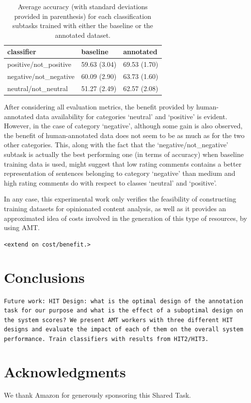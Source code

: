 \documentclass[11pt,letterpaper]{article}
\begin{document}
\begin{table}
\begin{tabular}{|l|l|l|}
\hline
classifier &baseline &annotated \\ 
\hline
positive/not\_positive &59.63 (3.04) &69.53 (1.70) \\ 
\hline
negative/not\_negative &60.09 (2.90) &63.73 (1.60) \\ 
\hline
neutral/not\_neutral &51.27 (2.49) &62.57 (2.08) \\ 
\hline
\end{tabular}
\caption{Average accuracy (with standard deviations provided in parenthesis) 
for each classification subtasks trained with either the baseline or the annotated dataset.}
\label{tc_accu}
\end{table}

After considering all evaluation metrics, the benefit provided by human-annotated data 
availability for categories `neutral' and `positive' is evident. However, in the case of category `negative', although some 
gain is also observed, the benefit of human-annotated data does not seem to be as much as for the two other 
categories. This, along with the fact that the `negative/not\_negative' subtask is actually the best performing
one (in terms of accuracy) when baseline training data is used, might suggest that low rating comments contains 
a better representation of sentences belonging to category `negative' than medium and high rating comments do with
respect to classes `neutral' and `positive'. 

In any case, this experimental work only verifies the feasibility of constructing training datasets for
opinionated content analysis, as well as it provides an approximated idea of costs involved in the generation
of this type of resources, by using AMT.

\texttt{<extend on cost/benefit.>}

\section{Conclusions}
\label{sect:conclusions}
\texttt{Future work: HIT Design: what is the optimal design of the annotation task for our purpose and what is the effect of a suboptimal design on the system scores? We present AMT workers with three different HIT designs and evaluate the impact of each of them on the overall system performance. Train classifiers with results from HIT2/HIT3.}

\section*{Acknowledgments}
We thank Amazon for generously sponsoring this Shared Task.



\end{document}
